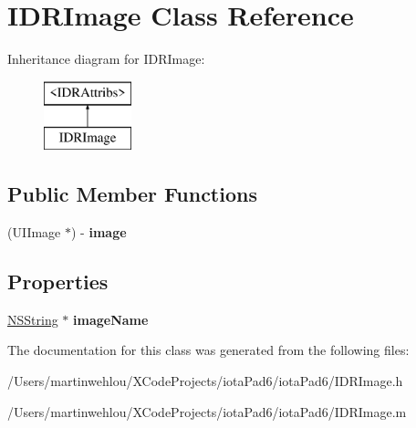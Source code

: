 \hypertarget{interface_i_d_r_image}{
\section{IDRImage Class Reference}
\label{interface_i_d_r_image}
}
Inheritance diagram for IDRImage:\begin{figure}[H]
\begin{center}
\leavevmode
\includegraphics[height=2.000000cm]{interface_i_d_r_image}
\end{center}
\end{figure}
\subsection*{Public Member Functions}
\begin{DoxyCompactItemize}
\item 
\hypertarget{interface_i_d_r_image_a2b7d737c784bc1d8f83ee0f2b4d2caf7}{
(UIImage $\ast$) -\/ {\bfseries image}}
\label{interface_i_d_r_image_a2b7d737c784bc1d8f83ee0f2b4d2caf7}

\end{DoxyCompactItemize}
\subsection*{Properties}
\begin{DoxyCompactItemize}
\item 
\hypertarget{interface_i_d_r_image_a68ee3a3b99d63666a097868d66baf5e6}{
\hyperlink{class_n_s_string}{NSString} $\ast$ {\bfseries imageName}}
\label{interface_i_d_r_image_a68ee3a3b99d63666a097868d66baf5e6}

\end{DoxyCompactItemize}


The documentation for this class was generated from the following files:\begin{DoxyCompactItemize}
\item 
/Users/martinwehlou/XCodeProjects/iotaPad6/iotaPad6/IDRImage.h\item 
/Users/martinwehlou/XCodeProjects/iotaPad6/iotaPad6/IDRImage.m\end{DoxyCompactItemize}
